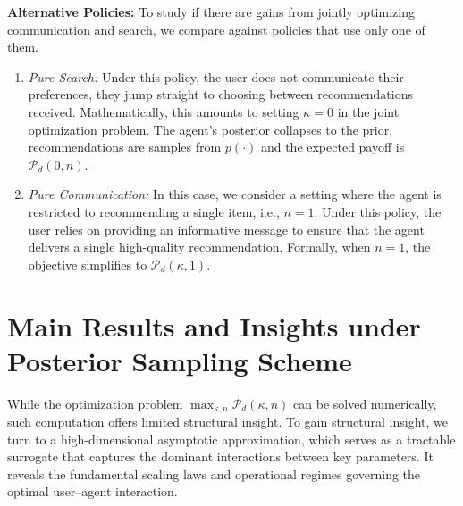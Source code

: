\documentclass[12pt]{article}
\theoremstyle{definition}
\theoremstyle{remark}
\begin{document}
\textbf{Alternative Policies:} To study if there are gains from jointly optimizing communication and search, we compare against policies that use only one of them.
\begin{enumerate}
    \item \textit{Pure Search:} Under this policy, the user does not communicate their preferences, they jump straight to choosing between recommendations received.
    Mathematically, this amounts to setting $\kappa=0$ in the joint optimization problem. The agent’s posterior collapses to the prior, recommendations are samples from $p(\cdot)$ and the expected payoff is $\mathcal{P}_d(0,n)$.

    \item \textit{Pure Communication:} In this case, we consider a setting where the agent is restricted to recommending a single item, i.e., $n=1$. Under this policy, the user relies on providing an informative message to ensure that the agent delivers a single high-quality recommendation. Formally, when $n=1$, the objective simplifies to $\mathcal{P}_d(\kappa,1)$.
\end{enumerate}

\section{Main Results and Insights under Posterior Sampling Scheme}
\label{sec:results_insights}
While the optimization problem $\max_{\kappa, n} \mathcal{P}_d(\kappa, n)$ can be solved numerically, such computation offers limited structural insight. To gain structural insight, we turn to a high-dimensional asymptotic approximation, which serves as a tractable surrogate that captures the dominant interactions between key parameters. It reveals the fundamental scaling laws and operational regimes governing the optimal user–agent interaction.
\end{document}
